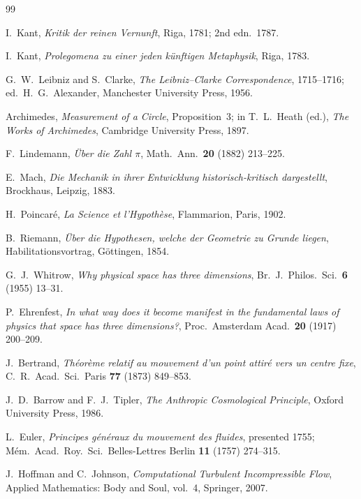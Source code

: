 \documentclass[11pt]{article}
\begin{document}
\begin{thebibliography}{99}

 I.~Kant, \emph{Kritik der reinen Vernunft}, Riga, 1781; 2nd edn.\ 1787.

 I.~Kant, \emph{Prolegomena zu einer jeden k\"unftigen Metaphysik}, Riga, 1783.

 G.~W.~Leibniz and S.~Clarke, \emph{The Leibniz--Clarke Correspondence},
1715--1716; ed.\ H.~G.~Alexander, Manchester University Press, 1956.

 Archimedes, \emph{Measurement of a Circle}, Proposition~3; in T.~L.~Heath
(ed.), \emph{The Works of Archimedes}, Cambridge University Press, 1897.

 F.~Lindemann, \emph{\"Uber die Zahl $\pi$}, Math.\ Ann.\ \textbf{20} (1882)
213--225.

 E.~Mach, \emph{Die Mechanik in ihrer Entwicklung historisch-kritisch dargestellt},
Brockhaus, Leipzig, 1883.

 H.~Poincar\'e, \emph{La Science et l'Hypoth\`ese}, Flammarion, Paris, 1902.

 B.~Riemann, \emph{\"Uber die Hypothesen, welche der Geometrie zu Grunde liegen},
Habilitationsvortrag, G\"ottingen, 1854.

 G.~J.~Whitrow, \emph{Why physical space has three dimensions},
Br.\ J.\ Philos.\ Sci.\ \textbf{6} (1955) 13--31.

 P.~Ehrenfest, \emph{In what way does it become manifest in the fundamental laws
of physics that space has three dimensions?}, Proc.\ Amsterdam Acad.\ \textbf{20} (1917) 200--209.

 J.~Bertrand, \emph{Th\'eor\`eme relatif au mouvement d'un point attir\'e vers un
centre fixe}, C.~R.\ Acad.\ Sci.\ Paris \textbf{77} (1873) 849--853.

 J.~D.~Barrow and F.~J.~Tipler, \emph{The Anthropic Cosmological Principle},
Oxford University Press, 1986.

 L.~Euler, \emph{Principes g\'en\'eraux du mouvement des fluides},
presented 1755; M\'em.\ Acad.\ Roy.\ Sci.\ Belles-Lettres Berlin \textbf{11} (1757) 274--315.

 J.~Hoffman and C.~Johnson, \emph{Computational Turbulent Incompressible Flow},
Applied Mathematics: Body and Soul, vol.~4, Springer, 2007.


\end{thebibliography}
\end{document}
